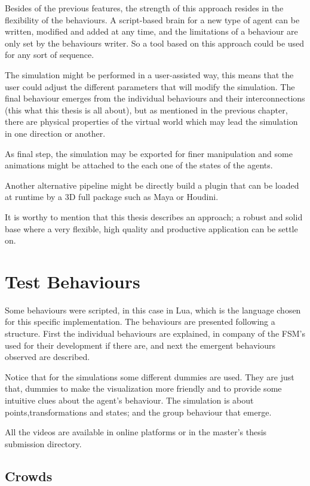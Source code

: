 Besides of the previous features, the strength of this approach resides in the flexibility of the behaviours. A script-based brain for a new type of agent can be written, modified and added at any time, and the limitations of a behaviour are only set by the behaviours writer. So a tool based on this approach could be used for any sort of sequence.

The simulation might be performed in a user-assisted way, this means that the user could adjust the different parameters that will modify the simulation. The final behaviour emerges from the individual behaviours and their interconnections (this what this thesis is all about), but as mentioned in the previous chapter, there are physical properties of the virtual world which may lead the simulation in one direction or another.

As final step, the simulation may be exported for finer manipulation and some animations might be attached to the each one of the states of the agents.

Another alternative pipeline might be directly build a plugin that can be loaded at runtime by a 3D full package such as Maya or Houdini.

It is worthy to mention that this thesis describes an approach; a robust and solid base where a very flexible, high quality and productive application can be settle on.

\section{Test Behaviours}

Some behaviours were scripted, in this case in Lua, which is the language chosen for this specific implementation. The behaviours are presented following a structure. First the individual behaviours are explained, in company of the FSM's used for their development if there are, and next the emergent behaviours observed are described.

Notice that for the simulations some different dummies are used. They are just that, dummies to make the visualization more friendly and to provide some intuitive clues about the agent's behaviour. The simulation is about points,transformations and states; and the group behaviour that emerge.

All the videos are available in online platforms or in the master's thesis submission directory.

\subsection{Crowds}


